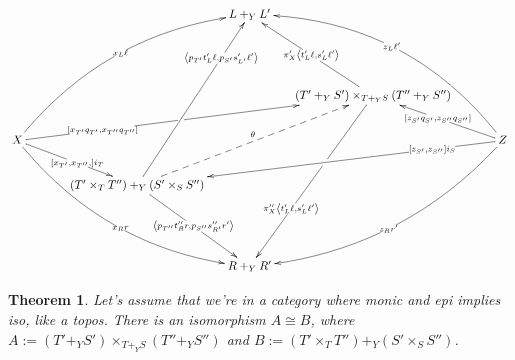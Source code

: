 \documentclass[12pt]{article}
\renewcommand{\(}{\left(}
\renewcommand{\)}{\right)}
\renewcommand{\{}{\left\lbrace}
\renewcommand{\}}{\right\rbrace}
\newtheorem*{thm}{Theorem}
\theoremstyle{remark}
\theoremstyle{definition}
\begin{document}
	\[
	\xymatrix@C=.5cm{
		{} &
		{} &
		{} &
		L +_Y L' &
		{} &
		{} &
		{} \\
		{} &
		{} &
		{} &
		{} &
		{} &
		{} &
		{} \\
		{} &
		{} &
		{} &
		{} &
		(T' +_Y S') \times_{T +_Y S} (T'' +_Y S'') 
		\ar[luu]|{\pi'_X \left\langle t'_L\ell, s'_L\ell' \right\rangle}
		\ar[ldddd]
		|(.39)\hole
		|>>>>>>>>>>>>>>>>>>{ \pi''_X \left\langle t'_L\ell, s'_L\ell' \right\rangle }  &
		{} &
		{} \\
		X 
		\ar@/^2pc/[rrruuu]|{x_L \ell} 
		\ar[rrrru]
		|<<<<<<<<<<<<<<<<<<<<<<<{ \left[ x_{T'}q_{T'}, x_{T''}q_{T''} \right] } 
		|(.46)\hole
		\ar[rrd]|{ \left[ x_{T'},x_{T''}, \right] i_T }
		\ar@/_2pc/[rrrddd]|{x_R r} &
		{} &
		{} &
		{} &
		{} &
		{} &
		Z 
		\ar@/_2.5pc/[llluuu]|{z_L \ell'}
		\ar[llu]|{ \left[ z_{S'}q_{S'},z_{S''}q_{S''} \right] } 
		\ar[lllld]|<<<<<<<<<<<<<<<<<<<{ \left[ z_{S'},z_{S''} \right] i_S  }
		\ar@/^2pc/[lllddd]|{z_R r'} \\
		{} &
		{} &
		(T' \times_T T'') +_Y (S' \times_S S'') 
		\ar[ruuuu]|>>>>>>>>>>>>>{ \left\langle p_{T'}t'_L\ell, p_{S'} s'_{L'}\ell' \right\rangle }
		\ar@{-->}[rruu]^{\theta}
		\ar[rdd]|{ \left\langle p_{T''} t''_Rr, p_{S''}s''_{R'}r' \right\rangle  } &
		{} &
		{} &
		{} &
		{} \\
		{} &
		{} &
		{} &
		{} &
		{} &
		{} &
		{} \\
		{} &
		{} &
		{} &
		R +_Y R' &
		{} &
		{} &
		{} 
	}
	\]

	\begin{thm}
		Let's assume that we're in a category where monic and epi implies iso, like 
		a topos. There is an isomorphism $A \cong B$, where $A := 
		(T'+_YS')\times_{T+_YS}(T''+_YS'')$ and $B := (T' \times_T T'') +_Y 
		(S'\times_SS'')$.  
	\end{thm}
	
\end{document}
